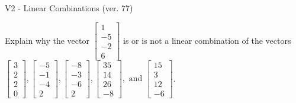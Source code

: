 \begin{exercise}
  \begin{exerciseTitle}V2 - Linear Combinations (ver. 77)\end{exerciseTitle}
  \begin{exerciseStatement}
    Explain why the vector \(\left[\begin{array}{c}
1 \\
-5 \\
-2 \\
6
\end{array}\right]\)  is or is not a linear 
	combination of the vectors \(\left[\begin{array}{c}
3 \\
2 \\
2 \\
0
\end{array}\right] , \left[\begin{array}{c}
-5 \\
-1 \\
-4 \\
2
\end{array}\right] , \left[\begin{array}{c}
-8 \\
-3 \\
-6 \\
2
\end{array}\right] , \left[\begin{array}{c}
35 \\
14 \\
26 \\
-8
\end{array}\right] , \text{ and } \left[\begin{array}{c}
15 \\
3 \\
12 \\
-6
\end{array}\right]\).
	



\end{exerciseStatement}
\end{exercise}
